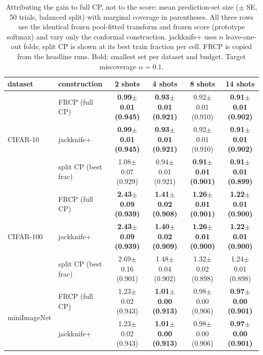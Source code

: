 \begin{table}[t]
\centering
\small
\caption{Attributing the gain to full CP, not to the score: mean prediction-set size ($\pm$ SE, 50 trials, balanced split) with marginal coverage in parentheses. All three rows use the identical frozen pool-fitted transform and frozen score (prototype softmax) and vary only the conformal construction. jackknife+ uses $n$ leave-one-out folds; split CP is shown at its best train fraction per cell. FRCP is copied from the headline runs. Bold: smallest set per dataset and budget. Target miscoverage $\alpha=0.1$.}
\label{tab:attrib-a01}
\begin{tabular}{llcccc}
\toprule
dataset & construction & 2 shots & 4 shots & 8 shots & 14 shots\\
\midrule
\multirow{3}{*}{CIFAR-10} & FRCP (full CP) & \textbf{0.99$\pm$0.01 {\scriptsize(0.945)}} & \textbf{0.93$\pm$0.01 {\scriptsize(0.921)}} & 0.92$\pm$0.01 {\scriptsize(0.910)} & \textbf{0.91$\pm$0.01 {\scriptsize(0.902)}}\\
 & jackknife+ & \textbf{0.99$\pm$0.01 {\scriptsize(0.945)}} & \textbf{0.93$\pm$0.01 {\scriptsize(0.921)}} & 0.92$\pm$0.01 {\scriptsize(0.910)} & \textbf{0.91$\pm$0.01 {\scriptsize(0.902)}}\\
 & split CP (best frac) & 1.08$\pm$0.07 {\scriptsize(0.929)} & 0.94$\pm$0.01 {\scriptsize(0.921)} & \textbf{0.91$\pm$0.01 {\scriptsize(0.901)}} & \textbf{0.91$\pm$0.01 {\scriptsize(0.899)}}\\
\midrule
\multirow{3}{*}{CIFAR-100} & FRCP (full CP) & \textbf{2.43$\pm$0.09 {\scriptsize(0.939)}} & \textbf{1.41$\pm$0.02 {\scriptsize(0.908)}} & \textbf{1.26$\pm$0.01 {\scriptsize(0.901)}} & \textbf{1.22$\pm$0.01 {\scriptsize(0.900)}}\\
 & jackknife+ & \textbf{2.43$\pm$0.09 {\scriptsize(0.939)}} & \textbf{1.40$\pm$0.02 {\scriptsize(0.909)}} & \textbf{1.26$\pm$0.01 {\scriptsize(0.900)}} & \textbf{1.22$\pm$0.01 {\scriptsize(0.900)}}\\
 & split CP (best frac) & 2.69$\pm$0.16 {\scriptsize(0.901)} & 1.48$\pm$0.04 {\scriptsize(0.902)} & 1.32$\pm$0.02 {\scriptsize(0.898)} & 1.24$\pm$0.01 {\scriptsize(0.898)}\\
\midrule
\multirow{3}{*}{miniImageNet} & FRCP (full CP) & 1.23$\pm$0.02 {\scriptsize(0.943)} & \textbf{1.01$\pm$0.00 {\scriptsize(0.913)}} & 0.98$\pm$0.00 {\scriptsize(0.906)} & \textbf{0.97$\pm$0.00 {\scriptsize(0.901)}}\\
 & jackknife+ & 1.23$\pm$0.02 {\scriptsize(0.943)} & \textbf{1.01$\pm$0.00 {\scriptsize(0.913)}} & 0.98$\pm$0.00 {\scriptsize(0.906)} & \textbf{0.97$\pm$0.00 {\scriptsize(0.901)}}\\

\end{tabular}
\end{table}
